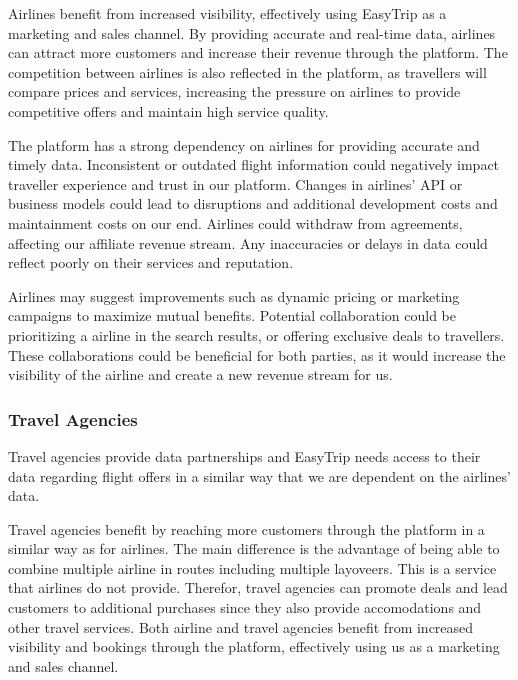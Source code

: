 Airlines benefit from increased visibility, effectively using EasyTrip as a marketing and sales channel. By providing accurate and real-time data, airlines can attract more customers and increase their revenue through the platform. The competition between airlines is also reflected in the platform, as travellers will compare prices and services, increasing the pressure on airlines to provide competitive offers and maintain high service quality.

The platform has a strong dependency on airlines for providing accurate and timely data. Inconsistent or outdated flight information could negatively impact traveller experience and trust in our platform. Changes in airlines' API or business models could lead to disruptions and additional development costs and maintainment costs on our end. Airlines could withdraw from agreements, affecting our affiliate revenue stream. Any inaccuracies or delays in data could reflect poorly on their services and reputation.

Airlines may suggest improvements such as dynamic pricing or marketing campaigns to maximize mutual benefits. Potential collaboration could be prioritizing a airline in the search results, or offering exclusive deals to travellers. These collaborations could be beneficial for both parties, as it would increase the visibility of the airline and create a new revenue stream for us.

\subsubsection{Travel Agencies}
Travel agencies provide data partnerships and EasyTrip needs access to their data regarding flight offers in a similar way that we are dependent on the airlines' data.

Travel agencies benefit by reaching more customers through the platform in a similar way as for airlines. The main difference is the advantage of being able to combine multiple airline in routes including multiple layoveers. This is a service that airlines do not provide. Therefor, travel agencies can promote deals and lead customers to additional purchases since they also provide accomodations and other travel services. Both airline and travel agencies benefit from increased visibility and bookings through the platform, effectively using us as a marketing and sales channel.

